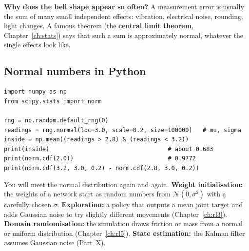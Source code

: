 \textbf{Why does the bell shape appear so often?} A measurement error is usually the sum of many small independent effects: vibration, electrical noise, rounding, light changes. A famous theorem (the \textbf{central limit theorem}, Chapter~\ref{ch:stats}) says that such a sum is approximately normal, whatever the single effects look like.

\subsection*{Normal numbers in Python}
\begin{verbatim}
import numpy as np
from scipy.stats import norm

rng = np.random.default_rng(0)
readings = rng.normal(loc=3.0, scale=0.2, size=100000)   # mu, sigma
inside = np.mean((readings > 2.8) & (readings < 3.2))
print(inside)                                  # about 0.683
print(norm.cdf(2.0))                           # 0.9772
print(norm.cdf(3.2, 3.0, 0.2) - norm.cdf(2.8, 3.0, 0.2))
\end{verbatim}

\begin{aibox}
You will meet the normal distribution again and again. \textbf{Weight initialisation:} the weights of a network start as random numbers from $\mathcal N(0,\sigma^2)$ with a carefully chosen $\sigma$. \textbf{Exploration:} a policy that outputs a mean joint target and adds Gaussian noise to try slightly different movements (Chapter~\ref{ch:rl3}). \textbf{Domain randomisation:} the simulation draws friction or mass from a normal or uniform distribution (Chapter~\ref{ch:rl5}). \textbf{State estimation:} the Kalman filter assumes Gaussian noise (Part~X).
\end{aibox}

